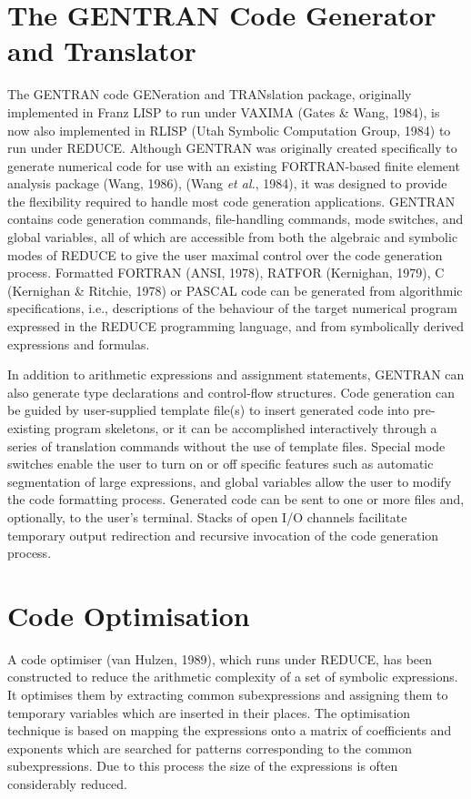 \section{The GENTRAN Code Generator and Translator}
The GENTRAN code GENeration and TRANslation package, originally
implemented in Franz LISP to run under VAXIMA (Gates \& Wang, 1984), is now also
implemented in RLISP (Utah Symbolic Computation Group, 1984)
to run under REDUCE.  Although GENTRAN
was originally created specifically to generate numerical
code for use with an existing FORTRAN-based finite element analysis
package (Wang, 1986), (Wang {\it et al.}, 1984), it was designed
to provide the flexibility required to handle most code generation
applications.  GENTRAN contains code generation commands, file-handling
commands, mode switches, and global variables, all of which are
accessible from both the algebraic and symbolic modes of REDUCE to
give the user maximal control over the code generation process.  Formatted
FORTRAN (ANSI, 1978), RATFOR (Kernighan, 1979), C (Kernighan \& Ritchie, 1978)
or PASCAL code can be generated from algorithmic specifications,
i.e., descriptions of the behaviour of the target numerical program expressed
in the REDUCE programming language, and from symbolically derived expressions
and formulas.

In addition to arithmetic expressions and assignment statements,
GENTRAN can also generate type declarations and control-flow
structures.  Code generation can be guided by user-supplied
template file(s) to insert generated code into pre-existing program
skeletons, or it can be accomplished interactively through a series
of translation commands without the use of template files.  Special
mode switches enable the user to turn on or off specific features such as
automatic segmentation of large expressions, and global variables
allow the user to modify the code formatting process.  Generated
code can be sent to one or more files and, optionally, to
the user's terminal.  Stacks of open I/O channels facilitate temporary
output redirection and recursive invocation of the code generation process.

\section{Code Optimisation}
A code optimiser (van Hulzen, 1989), which runs under REDUCE,
has been constructed
to reduce the arithmetic complexity of a set of
symbolic expressions.  It optimises them by extracting common
subexpressions and assigning them to temporary variables which
are inserted in their places.  The optimisation technique is
based on mapping the expressions onto a matrix of coefficients and exponents
which are searched for patterns corresponding to the common
subexpressions.  Due to this process the size of the expressions is often
considerably reduced.


